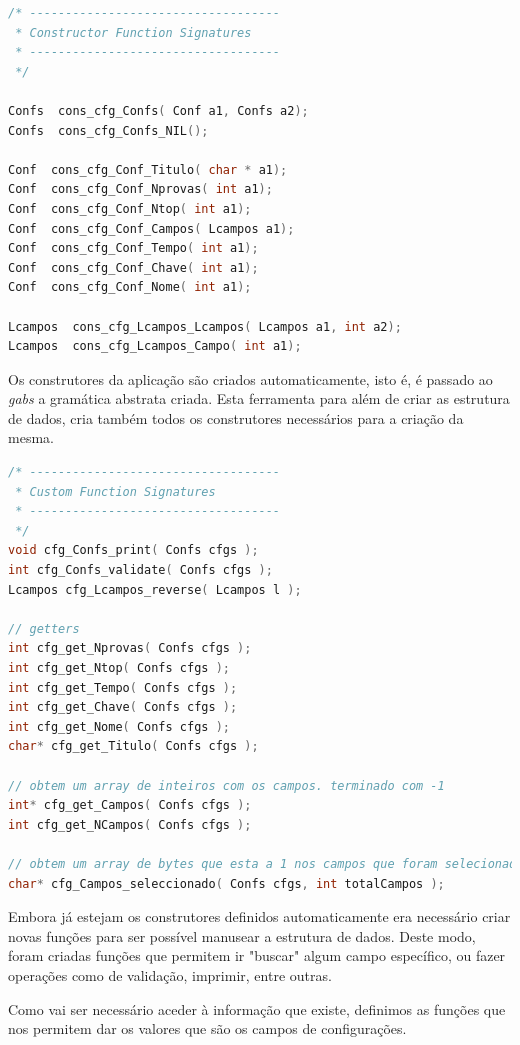 \documentclass[11pt, a4paper, oneside]{article}
\begin{document}
\begin{lstlisting}[language=C, caption={Construtores do ficheiro de configuração.}]
/* -----------------------------------
 * Constructor Function Signatures
 * -----------------------------------
 */

Confs  cons_cfg_Confs( Conf a1, Confs a2);
Confs  cons_cfg_Confs_NIL();

Conf  cons_cfg_Conf_Titulo( char * a1);
Conf  cons_cfg_Conf_Nprovas( int a1);
Conf  cons_cfg_Conf_Ntop( int a1);
Conf  cons_cfg_Conf_Campos( Lcampos a1);
Conf  cons_cfg_Conf_Tempo( int a1);
Conf  cons_cfg_Conf_Chave( int a1);
Conf  cons_cfg_Conf_Nome( int a1);

Lcampos  cons_cfg_Lcampos_Lcampos( Lcampos a1, int a2);
Lcampos  cons_cfg_Lcampos_Campo( int a1);
\end{lstlisting} 

Os construtores da aplicação são criados automaticamente, isto é, é passado ao \textit{gabs} a gramática abstrata criada. Esta ferramenta para além de criar as estrutura de dados, cria também todos os construtores necessários para a criação da mesma.

\begin{lstlisting}[language=C, caption={Funções do ficheiro de configuração.}]
/* -----------------------------------
 * Custom Function Signatures
 * -----------------------------------
 */
void cfg_Confs_print( Confs cfgs );
int cfg_Confs_validate( Confs cfgs );
Lcampos cfg_Lcampos_reverse( Lcampos l );

// getters
int cfg_get_Nprovas( Confs cfgs );
int cfg_get_Ntop( Confs cfgs );
int cfg_get_Tempo( Confs cfgs );
int cfg_get_Chave( Confs cfgs );
int cfg_get_Nome( Confs cfgs );
char* cfg_get_Titulo( Confs cfgs );

// obtem um array de inteiros com os campos. terminado com -1
int* cfg_get_Campos( Confs cfgs );
int cfg_get_NCampos( Confs cfgs );

// obtem um array de bytes que esta a 1 nos campos que foram selecionados
char* cfg_Campos_seleccionado( Confs cfgs, int totalCampos );
\end{lstlisting} 

Embora já estejam os construtores definidos automaticamente era necessário criar novas funções para ser possível manusear a estrutura de dados. Deste modo, foram criadas funções que permitem ir "buscar" algum campo específico, ou fazer operações como de validação, imprimir, entre outras.

Como vai ser necessário aceder à informação que existe, definimos as funções que nos permitem dar os valores que são os campos de configurações.
\end{document}

